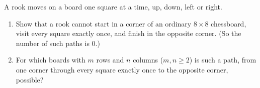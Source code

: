A rook moves on a board one square at a time, up, down, left or right.
\begin{enumerate}
\item[(a)] Show that a rook cannot start in a corner of an ordinary $8\times8$ chessboard, visit every square exactly once, and finish in the opposite corner. (So the number of such paths is $0$.)
\item[(b)] For which boards with $m$ rows and $n$ columns ($m,n\ge2$) is such a path, from one corner through every square exactly once to the opposite corner, possible?
\end{enumerate}

